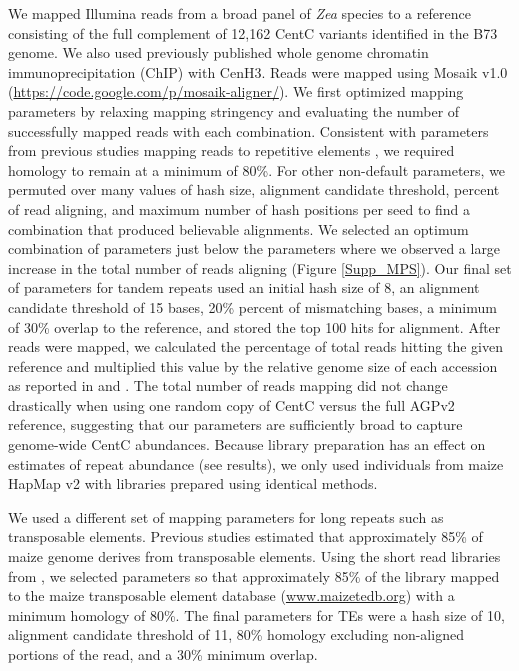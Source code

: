 We mapped Illumina reads from a broad panel of \emph{Zea} species \citep{Chia2012,Tenaillon2011}  to a reference consisting of the full complement of 12,162 CentC variants identified in the B73 genome.  
We also used previously published whole genome chromatin immunoprecipitation (ChIP) \citep{Wolfgruber2009, Wang2013} with CenH3.  Reads were mapped using  Mosaik v1.0 (\url{https://code.google.com/p/mosaik-aligner/}). We first optimized mapping parameters by relaxing mapping stringency and evaluating the number of successfully mapped reads with each combination.  Consistent with parameters from previous studies mapping reads to repetitive elements \citep{Tenaillon2011}, we required homology to remain at a minimum of 80\%.  For other non-default parameters, we permuted over many values of hash size, alignment candidate threshold,  percent of read aligning, and maximum number of hash positions per seed to find a combination that produced believable alignments.  We selected an optimum combination of parameters just below the parameters where we observed a large increase in the total number of reads aligning (Figure \ref{Supp_MPS}).    Our final set of parameters for tandem repeats used an initial hash size of 8, an alignment candidate threshold of 15 bases, 20\% percent of mismatching bases, a minimum of 30\% overlap to the reference, and stored the top 100 hits for alignment.  After reads were mapped, we calculated the percentage of total reads hitting the given reference and multiplied this value by the relative genome size of each accession as reported in \citet{Chia2012} and \citet{Tenaillon2011}. The total number of reads mapping did not change drastically when using one random copy of CentC versus the full AGPv2 reference, suggesting that our parameters are sufficiently broad to capture genome-wide CentC abundances.  Because library preparation has an effect on estimates of repeat abundance (see results), we only used individuals from maize HapMap v2 \citep{Chia2012} with libraries prepared using identical methods.
	
We used a different set of mapping parameters for long repeats such as transposable elements.  Previous studies \citep{Schnable2009} estimated that approximately 85\% of maize genome derives from transposable elements.  Using the short read libraries from \citet{Tenaillon2011}, we selected parameters so that approximately 85\% of the library mapped to the maize transposable element database (\url{www.maizetedb.org}) with a minimum homology of 80\%.  The final parameters for TEs were a hash size of 10, alignment candidate threshold of 11, 80\% homology excluding non-aligned portions of the read, and a 30\% minimum overlap.

